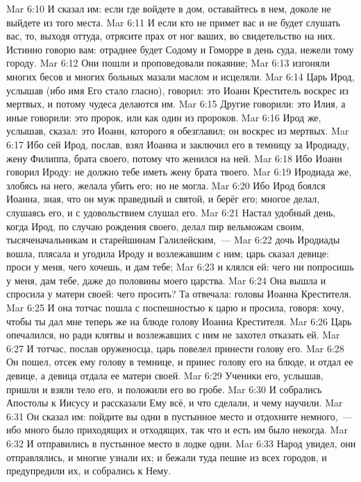 \vs Mar 6:10 И сказал им: если где войдете в дом, оставайтесь в нем, доколе не выйдете из того места.
\vs Mar 6:11 И если кто не примет вас и не будет слушать вас, то, выходя оттуда, отрясите прах от ног ваших, во свидетельство на них. Истинно говорю вам: отраднее будет Содому и Гоморре в день суда, нежели тому городу.
\vs Mar 6:12 Они пошли и проповедовали покаяние;
\vs Mar 6:13 изгоняли многих бесов и многих больных мазали маслом и исцеляли.
\rsbpar\vs Mar 6:14 Царь Ирод, услышав  (ибо имя Его стало гласно), говорил: это Иоанн Креститель воскрес из мертвых, и потому чудеса делаются им.
\vs Mar 6:15 Другие говорили: это Илия, а иные говорили: это пророк, или как один из пророков.
\vs Mar 6:16 Ирод же, услышав, сказал: это Иоанн, которого я обезглавил; он воскрес из мертвых.
\vs Mar 6:17 Ибо сей Ирод, послав, взял Иоанна и заключил его в темницу за Иродиаду, жену Филиппа, брата своего, потому что женился на ней.
\vs Mar 6:18 Ибо Иоанн говорил Ироду: не должно тебе иметь жену брата твоего.
\vs Mar 6:19 Иродиада же, злобясь на него, желала убить его; но не могла.
\vs Mar 6:20 Ибо Ирод боялся Иоанна, зная, что он муж праведный и святой, и берёг его; многое делал, слушаясь его, и с удовольствием слушал его.
\vs Mar 6:21 Настал удобный день, когда Ирод, по случаю  рождения своего, делал пир вельможам своим, тысяченачальникам и старейшинам Галилейским,~---
\vs Mar 6:22 дочь Иродиады вошла, плясала и угодила Ироду и возлежавшим с ним; царь сказал девице: проси у меня, чего хочешь, и дам тебе;
\vs Mar 6:23 и клялся ей: чего ни попросишь у меня, дам тебе, даже до половины моего царства.
\vs Mar 6:24 Она вышла и спросила у матери своей: чего просить? Та отвечала: головы Иоанна Крестителя.
\vs Mar 6:25 И она тотчас пошла с поспешностью к царю и просила, говоря: хочу, чтобы ты дал мне теперь же на блюде голову Иоанна Крестителя.
\vs Mar 6:26 Царь опечалился, но ради клятвы и возлежавших с ним не захотел отказать ей.
\vs Mar 6:27 И тотчас, послав оруженосца, царь повелел принести голову его.
\vs Mar 6:28 Он пошел, отсек ему голову в темнице, и принес голову его на блюде, и отдал ее девице, а девица отдала ее матери своей.
\vs Mar 6:29 Ученики его, услышав, пришли и взяли тело его, и положили его во гробе.
\rsbpar\vs Mar 6:30 И собрались Апостолы к Иисусу и рассказали Ему всё, и что сделали, и чему научили.
\vs Mar 6:31 Он сказал им: пойдите вы одни в пустынное место и отдохните немного,~--- ибо много было приходящих и отходящих, так что и есть им было некогда.
\vs Mar 6:32 И отправились в пустынное место в лодке одни.
\vs Mar 6:33 Народ увидел,  они отправлялись, и многие узнали их; и бежали туда пешие из всех городов, и предупредили их, и собрались к Нему.
